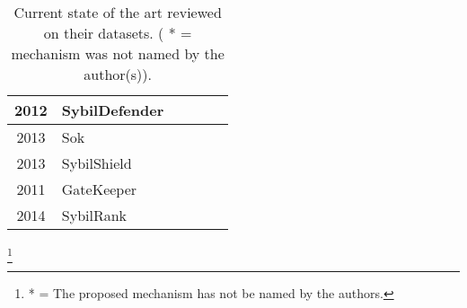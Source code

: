 \begin{table*}
\begin{tabular}{|c|l|l|l|l|l|}
			2012 & SybilDefender \cite{wei2012sybildefender} &  & & & \\ \hline
			
			2013 & Sok \cite{alvisi2013sok} &  & & & \\ \hline
			
			2013 & SybilShield \cite{shi2013sybilshield} &  & & & \\ \hline
			
			2011 & GateKeeper \cite{tran2011optimal} &  & & & \\ \hline
			
			2014 & SybilRank \cite{cao2014understanding} & & & & \\ \hline
			
			
		\end{tabular}
		\caption{Current state of the art reviewed on their datasets. ( * = mechanism was not named by the author(s)).}
		\label{tbl:state-of-the-art-reviewed}
	\end{table*}
	
	
	\footnote{* = The proposed mechanism has not be named by the authors.}